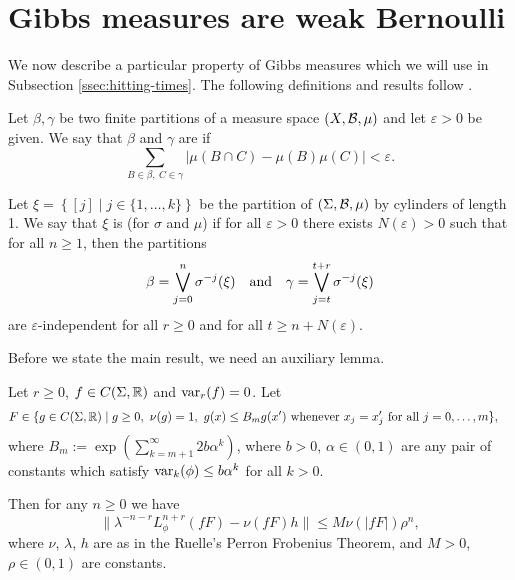 \section{Gibbs measures are weak Bernoulli}
We now describe a particular property of Gibbs measures which we will use in Subsection \ref{ssec:hitting-times}. The following definitions and results follow \cite[Section 1.E]{bowen:equilibrium}.

\begin{definition}
	Let $\beta, \gamma$ be two finite partitions of a measure space $(X, \mathcal{B}, \mu)$ and let $\varepsilon > 0$ be given. We say that $\beta$ and $\gamma$ are  if
	\[
		\sum_{B \in \beta,\ C \in \gamma}{|\mu(B \cap C) - \mu(B)\mu(C)|} < \varepsilon.
	\]
\end{definition}

\begin{definition}
	Let $\xi = \left\{[j] \mid j \in \{1, \dots, k\}\right\}$ be the partition of $(\Sigma, \mathcal{B}, \mu)$ by cylinders of length 1. We say that $\xi$ is  (for $\sigma$ and $\mu$) if for all $\varepsilon > 0$ there exists $N(\varepsilon) > 0$ such that for all $n \geq 1$, then the partitions
	\[
		\beta = \bigvee_{j = 0}^n{\sigma^{-j}(\xi)} \quad \text{and} \quad \gamma = \bigvee_{j = t}^{t + r}{\sigma^{-j}(\xi)}
	\]
	are $\varepsilon$-independent for all $r \geq 0$ and for all $t \geq n + N(\varepsilon)$.
\end{definition}

Before we state the main result, we need an auxiliary lemma.

\begin{lemma}\label{bowen:lem-1-12}
	Let $r \geq 0$, $f \in C(\Sigma, \mathbb{R})$ and $\operatorname{var}_r(f) = 0$. Let
	\begin{align*}
		F \in \{g \in C(\Sigma, \mathbb{R}) \mid g & \geq 0,\ \nu(g) = 1,\ g(x) \leq B_m g(x') \text{ whenever } x_j = x'_j \text{ for all } j = 0, \dots, m\},
	\end{align*}
	where $B_m := \exp\left(\sum_{k = m + 1}^\infty{2b\alpha^k}\right)$, where $b > 0$, $\alpha \in (0, 1)$ are any pair of constants which satisfy $\operatorname{var}_k(\phi) \leq b\alpha^k$ for all $k > 0$.
	
	Then for any $n \geq 0$ we have
	\[
		\|\lambda^{-n - r}L_\phi^{n + r}(fF) - \nu(fF)h\| \leq M\nu(|fF|)\rho^n,
	\]
	where $\nu$, $\lambda$, $h$ are as in the Ruelle's Perron Frobenius Theorem, and $M > 0$, $\rho \in (0, 1)$ are constants.
\end{lemma}

